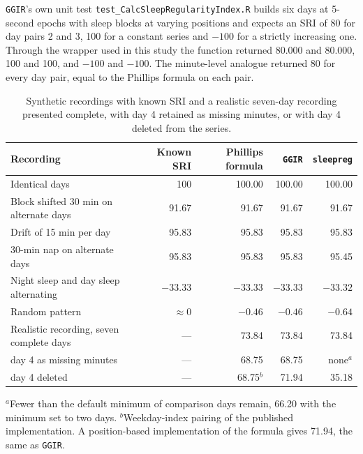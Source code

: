 \documentclass[12pt]{article}
\begin{document}
\texttt{GGIR}'s own unit test \texttt{test\_CalcSleepRegularityIndex.R} builds six days at 5-second epochs with sleep blocks at varying positions and expects an SRI of 80 for day pairs 2 and 3, 100 for a constant series and $-100$ for a strictly increasing one. Through the wrapper used in this study the function returned 80.000 and 80.000, 100 and 100, and $-100$ and $-100$. The minute-level analogue returned 80 for every day pair, equal to the Phillips formula on each pair.

\begin{table}[t]
\centering
\caption{Synthetic recordings with known SRI and a realistic seven-day recording presented complete, with day 4 retained as missing minutes, or with
day 4 deleted from the series.}
\label{tab:S_synthetic}
\setlength{\tabcolsep}{4pt}
\begin{tabular}{lrrrr}
\toprule
Recording & Known SRI & Phillips formula & \texttt{GGIR} & \texttt{sleepreg} \\
\midrule
Identical days & 100 & 100.00 & 100.00 & 100.00 \\
Block shifted 30 min on alternate days & 91.67 & 91.67 & 91.67 & 91.67 \\
Drift of 15 min per day & 95.83 & 95.83 & 95.83 & 95.83 \\
30-min nap on alternate days & 95.83 & 95.83 & 95.83 & 95.45 \\
Night sleep and day sleep alternating & $-33.33$ & $-33.33$ & $-33.33$ & $-33.32$ \\
Random pattern & $\approx 0$ & $-0.46$ & $-0.46$ & $-0.64$ \\
\midrule
Realistic recording, seven complete days & --- & 73.84 & 73.84 & 73.84 \\
\quad day 4 as missing minutes & --- & 68.75 & 68.75 & none$^a$ \\
\quad day 4 deleted & --- & 68.75$^b$ & 71.94 & 35.18 \\
\bottomrule
\end{tabular}
\par\smallskip\raggedright\footnotesize $^a$Fewer than the default minimum of
comparison days remain, 66.20 with the minimum set to two days.
$^b$Weekday-index pairing of the published implementation. A position-based
implementation of the formula gives 71.94, the same as \texttt{GGIR}.
\end{table}

\clearpage
\end{document}
